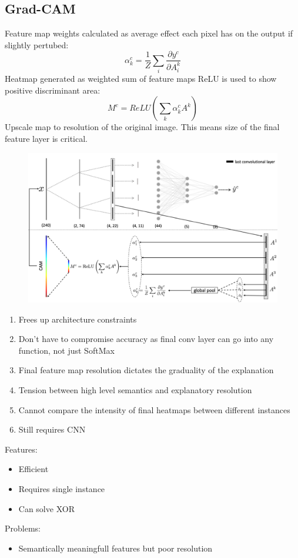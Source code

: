\subsection{Grad-CAM}
Feature map weights calculated as average effect each pixel has on the output if slightly pertubed:
\[
\alpha_k^c = \frac{1}{Z}\sum_{i} \frac{\partial y^c}{\partial A_i^k}
\]
Heatmap generated as weighted sum of feature maps ReLU is used to show positive discriminant area:
\[
M^c = ReLU\left(\sum_{k}\alpha_k^c A^k\right)
\]
Upscale map to resolution of the original image. This means size of the final feature layer is critical.
\begin{figure}[!h]
    \includegraphics[width =  \columnwidth]{figures/XAI2/GRADCAM.png}
\end{figure}
\begin{enumerate}
    \item Frees up architecture constraints
    \item Don't have to compromise accuracy as final conv layer can go into any function, not just SoftMax
    \item Final feature map resolution dictates the graduality of the explanation
    \item Tension between high level semantics and explanatory resolution
    \item Cannot compare the intensity of final heatmaps between different instances
    \item Still requires CNN
\end{enumerate}
Features:
\begin{itemize}
    \item Efficient
    \item Requires single instance
    \item Can solve XOR
\end{itemize}
Problems:
\begin{itemize}
    \item Semantically meaningfull features but poor resolution
\end{itemize}

